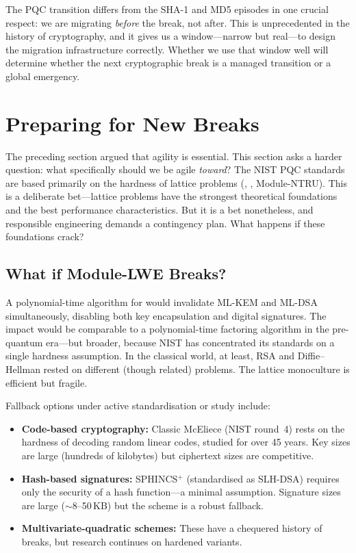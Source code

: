 The PQC transition differs from the SHA-1 and MD5 episodes in one crucial respect: we are migrating \emph{before} the break, not after.  This is unprecedented in the history of cryptography, and it gives us a window---narrow but real---to design the migration infrastructure correctly.  Whether we use that window well will determine whether the next cryptographic break is a managed transition or a global emergency.


\section{Preparing for New Breaks}
\label{sec:preparing-breaks}

The preceding section argued that agility is essential.  This section asks a harder question: what specifically should we be agile \emph{toward}?  The NIST PQC standards are based primarily on the hardness of lattice problems (\mlwe{}, \rlwe{}, Module-NTRU).  This is a deliberate bet---lattice problems have the strongest theoretical foundations and the best performance characteristics.  But it is a bet nonetheless, and responsible engineering demands a contingency plan.  What happens if these foundations crack?

\subsection{What if Module-LWE Breaks?}
\label{subsec:mlwe-break}

A polynomial-time algorithm for \mlwe{} would invalidate ML-KEM and ML-DSA simultaneously, disabling both key encapsulation and digital signatures.  The impact would be comparable to a polynomial-time factoring algorithm in the pre-quantum era---but broader, because NIST has concentrated its standards on a single hardness assumption.  In the classical world, at least, RSA and Diffie--Hellman rested on different (though related) problems.  The lattice monoculture is efficient but fragile.

Fallback options under active standardisation or study include:
\begin{itemize}
\item \textbf{Code-based cryptography:} Classic McEliece (NIST round~4) rests on the hardness of decoding random linear codes, studied for over 45 years.  Key sizes are large (hundreds of kilobytes) but ciphertext sizes are competitive.
\item \textbf{Hash-based signatures:} SPHINCS$^+$ (standardised as SLH-DSA) requires only the security of a hash function---a minimal assumption.  Signature sizes are large ($\sim$8--50\,KB) but the scheme is a robust fallback.
\item \textbf{Multivariate-quadratic schemes:} These have a chequered history of breaks, but research continues on hardened variants.
\end{itemize}

